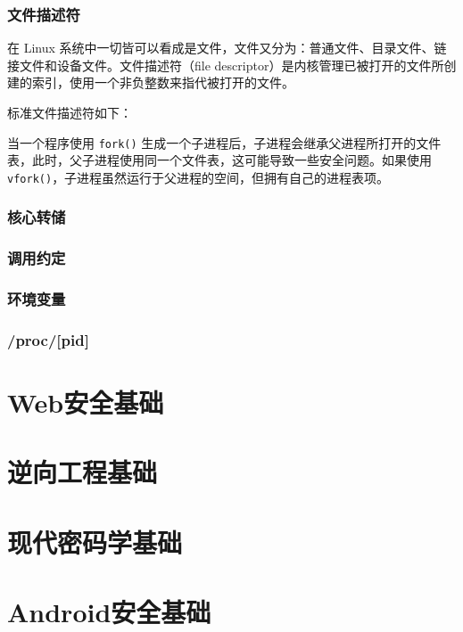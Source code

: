 \subsubsection{文件描述符}
\indent \setlength{\parindent}{2em}

\indent 在 Linux 系统中一切皆可以看成是文件，文件又分为：普通文件、目录文件、链接文件和设备文件。文件描述符（file descriptor）是内核管理已被打开的文件所创建的索引，使用一个非负整数来指代被打开的文件。

\indent 标准文件描述符如下：

\indent 当一个程序使用 \verb+fork()+ 生成一个子进程后，子进程会继承父进程所打开的文件表，此时，父子进程使用同一个文件表，这可能导致一些安全问题。如果使用 \verb+vfork()+，子进程虽然运行于父进程的空间，但拥有自己的进程表项。

\subsubsection{核心转储}
\indent \setlength{\parindent}{2em}

\subsubsection{调用约定}
\indent \setlength{\parindent}{2em}

\subsubsection{环境变量}
\indent \setlength{\parindent}{2em}

\subsubsection{/proc/[pid]}
\indent \setlength{\parindent}{2em}

\section{Web安全基础}
\indent \setlength{\parindent}{2em}

\section{逆向工程基础}
\indent \setlength{\parindent}{2em}

\section{现代密码学基础}
\indent \setlength{\parindent}{2em}

\section{Android安全基础}
\indent \setlength{\parindent}{2em}
